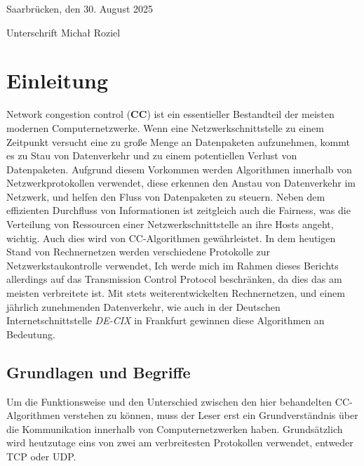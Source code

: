 \documentclass[paper=a4,fontsize=12pt,ngerman]{scrartcl}
\begin{document}
Saarbrücken, den 30. August 2025

\smallskip
Unterschrift  Micha\l{} Roziel




\clearpage
\tableofcontents 

\clearpage
{}



\section{Einleitung}

Network congestion control (\textbf{CC}) ist ein essentieller Bestandteil der 
meisten modernen Computernetzwerke. 
Wenn eine Netzwerkschnittstelle zu einem Zeitpunkt versucht eine zu große Menge an Datenpaketen aufzunehmen,
kommt es zu Stau von Datenverkehr und zu einem potentiellen Verlust von Datenpaketen.
Aufgrund diesem Vorkommen werden Algorithmen innerhalb von Netzwerkprotokollen verwendet, diese erkennen den Anstau von Datenverkehr im Netzwerk,
und helfen den Fluss von Datenpaketen zu steuern. Neben dem effizienten Durchfluss von Informationen ist zeitgleich auch die Fairness, 
was die Verteilung von Ressourcen einer Netzwerkschnittstelle an ihre Hosts angeht, wichtig. Auch dies wird von CC-Algorithmen gewährleistet.
In dem heutigen Stand von Rechnernetzen werden verschiedene Protokolle zur Netzwerkstaukontrolle verwendet, 
Ich werde mich im Rahmen dieses Berichts allerdings auf das Transmission Control Protocol beschränken, da dies das am meisten verbreitete ist.  \newline
\newline
Mit stets weiterentwickelten Rechnernetzen, und einem jährlich zunehmenden Datenverkehr, wie auch in der Deutschen Internetschnittstelle
\textit{DE-CIX}\cite{DE-CIX2025} in Frankfurt gewinnen diese Algorithmen an Bedeutung. 






\subsection{Grundlagen und Begriffe}
Um die Funktionsweise und den Unterschied zwischen den hier behandelten CC-Algorithmen verstehen zu können, muss der Leser erst ein Grundverständnis über die Kommunikation innerhalb von Computernetzwerken haben.
Grundsätzlich wird heutzutage eins von zwei am verbreitesten Protokollen verwendet, entweder 
TCP oder UDP. 
\end{document}
